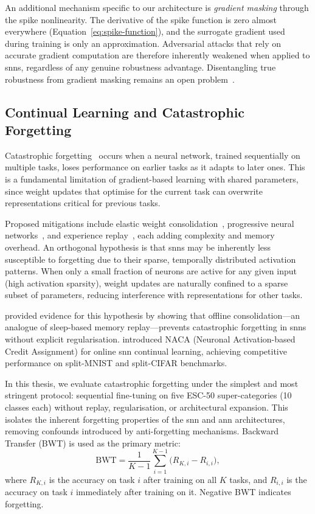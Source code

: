 An additional mechanism specific to our architecture is \emph{gradient masking} through the spike nonlinearity. The derivative of the spike function is zero almost everywhere (Equation~\ref{eq:spike-function}), and the surrogate gradient used during training is only an approximation. Adversarial attacks that rely on accurate gradient computation are therefore inherently weakened when applied to \glspl{snn}, regardless of any genuine robustness advantage. Disentangling true robustness from gradient masking remains an open problem~\citep{wang2025sapgd}.

\subsection{Continual Learning and Catastrophic Forgetting}
\label{subsec:cl-background}

Catastrophic forgetting~\citep{mccloskey1989,french1999} occurs when a neural network, trained sequentially on multiple tasks, loses performance on earlier tasks as it adapts to later ones. This is a fundamental limitation of gradient-based learning with shared parameters, since weight updates that optimise for the current task can overwrite representations critical for previous tasks.

Proposed mitigations include elastic weight consolidation~\citep{kirkpatrick2017}, progressive neural networks~\citep{rusu2016}, and experience replay~\citep{rolnick2019}, each adding complexity and memory overhead. An orthogonal hypothesis is that \glspl{snn} may be inherently less susceptible to forgetting due to their sparse, temporally distributed activation patterns. When only a small fraction of neurons are active for any given input (high activation sparsity), weight updates are naturally confined to a sparse subset of parameters, reducing interference with representations for other tasks.

\citet{golden2022} provided evidence for this hypothesis by showing that offline consolidation---an analogue of sleep-based memory replay---prevents catastrophic forgetting in \glspl{snn} without explicit regularisation. \citet{zhang2023} introduced NACA (Neuronal Activation-based Credit Assignment) for online \gls{snn} continual learning, achieving competitive performance on split-MNIST and split-CIFAR benchmarks.

In this thesis, we evaluate catastrophic forgetting under the simplest and most stringent protocol: sequential fine-tuning on five ESC-50 super-categories (10 classes each) without replay, regularisation, or architectural expansion. This isolates the inherent forgetting properties of the \gls{snn} and \gls{ann} architectures, removing confounds introduced by anti-forgetting mechanisms. Backward Transfer (BWT) is used as the primary metric:
\begin{equation}
    \mathrm{BWT} = \frac{1}{K-1}\sum_{i=1}^{K-1}\bigl(R_{K,i} - R_{i,i}\bigr),
    \label{eq:bwt}
\end{equation}
where $R_{K,i}$ is the accuracy on task $i$ after training on all $K$ tasks, and $R_{i,i}$ is the accuracy on task $i$ immediately after training on it. Negative BWT indicates forgetting.


